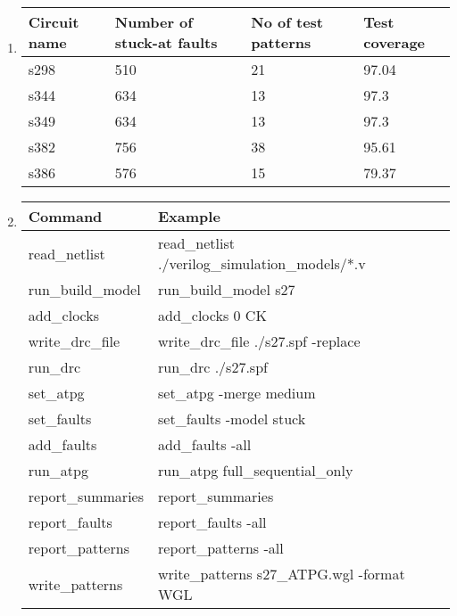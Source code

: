 \documentclass[a4paper,12pt]{article}
\begin{document}
\begin{enumerate}
        \item \begin{tabularx}{\textwidth}{|X|X|X|X|}
                \hline
                Circuit name & Number of stuck-at faults & No of test patterns & Test coverage \\ \hline
                s298 & 510 & 21 & 97.04 \\ \hline
                s344 & 634 & 13 & 97.3 \\ \hline
                s349 & 634 & 13 & 97.3 \\ \hline
                s382 & 756 & 38 & 95.61 \\ \hline
                s386 & 576 & 15 & 79.37 \\ \hline
            \end{tabularx}

        \item \begin{tabularx}{\textwidth}{|X|X|}
                \hline
                Command & Example \\ \hline
                read\_netlist & read\_netlist ./verilog\_simulation\_models/*.v \\ \hline
                run\_build\_model & run\_build\_model s27 \\ \hline
                add\_clocks & add\_clocks 0 CK \\ \hline
                write\_drc\_file & write\_drc\_file ./s27.spf -replace \\ \hline
                run\_drc & run\_drc ./s27.spf \\ \hline
                set\_atpg & set\_atpg -merge medium \\ \hline
                set\_faults & set\_faults -model stuck \\ \hline
                add\_faults & add\_faults -all \\ \hline
                run\_atpg & run\_atpg full\_sequential\_only \\ \hline
                report\_summaries & report\_summaries \\ \hline
                report\_faults & report\_faults -all \\ \hline
                report\_patterns & report\_patterns -all \\ \hline
                write\_patterns & write\_patterns s27\_ATPG.wgl -format WGL \\ \hline
            \end{tabularx}

    \end{enumerate}
\end{document}
